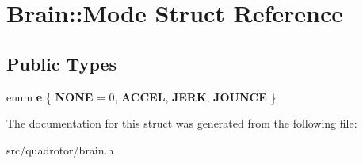 \hypertarget{structBrain_1_1Mode}{
\section{Brain::Mode Struct Reference}
\label{structBrain_1_1Mode}
}
\subsection*{Public Types}
\begin{DoxyCompactItemize}
\item 
enum {\bfseries e} \{ {\bfseries NONE} =  0, 
{\bfseries ACCEL}, 
{\bfseries JERK}, 
{\bfseries JOUNCE}
 \}
\end{DoxyCompactItemize}


The documentation for this struct was generated from the following file:\begin{DoxyCompactItemize}
\item 
src/quadrotor/brain.h\end{DoxyCompactItemize}
